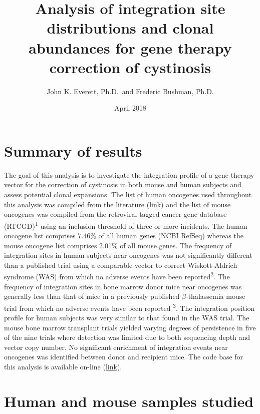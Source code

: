 \documentclass[12pt,]{article}
\title{Analysis of integration site distributions and clonal abundances for
gene therapy correction of cystinosis}
\author{John K. Everett, Ph.D.~and Frederic Bushman, Ph.D.}
\date{April 2018}
\begin{document}
\maketitle

{
\setcounter{tocdepth}{2}
\tableofcontents
}
\captionsetup[table]{labelformat=empty}

\newpage

\section{Summary of results}\label{summary-of-results}

The goal of this analysis is to investigate the integration profile of a
gene therapy vector for the correction of cystinosis in both mouse and
human subjects and assess potential clonal expansions. The list of human
oncogenes used throughout this analysis was compiled from the literature
(\href{http://www.bushmanlab.org/assets/doc/allOnco_Feb2017.tsv}{link})
and the list of mouse oncogenes was compiled from the retroviral tagged
cancer gene database (RTCGD)\textsuperscript{1} using an inclusion
threshold of three or more incidents. The human oncogene list comprises
7.46\% of all human genes (NCBI RefSeq) whereas the mouse oncogene list
comprises 2.01\% of all mouse genes. The frequency of integration sites
in human subjects near oncogenes was not significantly different than a
published trial using a comparable vector to correct Wiskott-Aldrich
syndrome (WAS) from which no adverse events have been
reported\textsuperscript{2}. The frequency of integration sites in bone
marrow donor mice near oncogenes was generally less than that of mice in
a previously published \(\beta\)-thalassemia mouse trial from which no
adverse events have been reported \textsuperscript{3}. The integration
position profile for human subjects was very similar to that found in
the WAS trial. The mouse bone marrow transplant trials yielded varying
degrees of persistence in five of the nine trials where detection was
limited due to both sequencing depth and vector copy number. No
significant enrichment of integration events near oncogenes was
identified between donor and recipient mice. The code base for this
analysis is available on-line
(\href{https://github.com/everettJK/project.geneTherapy.ucsdMouseCystinosis}{link}).

\vspace{0.1cm}

\section{Human and mouse samples
studied}\label{human-and-mouse-samples-studied}
\end{document}

